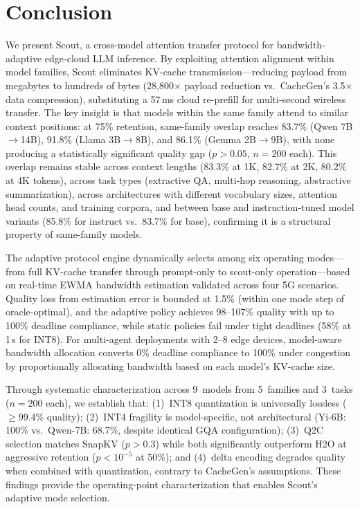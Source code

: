 \documentclass[journal]{IEEEtran}
\newcommand{\QtoC}{\textsc{Q2C}\xspace}
\begin{document}
\section{Conclusion}
\label{sec:conclusion}

We present Scout, a cross-model attention transfer protocol for bandwidth-adaptive edge-cloud LLM inference.
By exploiting attention alignment within model families, Scout eliminates KV-cache transmission---reducing payload from megabytes to hundreds of bytes (28{,}800$\times$ payload reduction vs.\ CacheGen's 3.5$\times$ data compression), substituting a 57\,ms cloud re-prefill for multi-second wireless transfer.
The key insight is that models within the same family attend to similar context positions: at 75\% retention, same-family overlap reaches 83.7\% (Qwen 7B$\to$14B), 91.8\% (Llama 3B$\to$8B), and 86.1\% (Gemma 2B$\to$9B), with none producing a statistically significant quality gap ($p > 0.05$, $n = 200$ each).
This overlap remains stable across context lengths (83.3\% at 1K, 82.7\% at 2K, 80.2\% at 4K tokens), across task types (extractive QA, multi-hop reasoning, abstractive summarization), across architectures with different vocabulary sizes, attention head counts, and training corpora, and between base and instruction-tuned model variants (85.8\% for instruct vs.\ 83.7\% for base), confirming it is a structural property of same-family models.

The adaptive protocol engine dynamically selects among six operating modes---from full KV-cache transfer through prompt-only to scout-only operation---based on real-time EWMA bandwidth estimation validated across four 5G scenarios.
Quality loss from estimation error is bounded at 1.5\% (within one mode step of oracle-optimal), and the adaptive policy achieves 98--107\% quality with up to 100\% deadline compliance, while static policies fail under tight deadlines (58\% at 1\,s for INT8).
For multi-agent deployments with 2--8 edge devices, model-aware bandwidth allocation converts 0\% deadline compliance to 100\% under congestion by proportionally allocating bandwidth based on each model's KV-cache size.

Through systematic characterization across 9~models from 5~families and 3~tasks ($n = 200$ each), we establish that: (1)~INT8 quantization is universally lossless ($\geq$99.4\% quality); (2)~INT4 fragility is model-specific, not architectural (Yi-6B: 100\% vs.\ Qwen-7B: 68.7\%, despite identical GQA configuration); (3)~\QtoC selection matches SnapKV ($p > 0.3$) while both significantly outperform H2O at aggressive retention ($p < 10^{-5}$ at 50\%); and (4)~delta encoding degrades quality when combined with quantization, contrary to CacheGen's assumptions.
These findings provide the operating-point characterization that enables Scout's adaptive mode selection.
\end{document}

